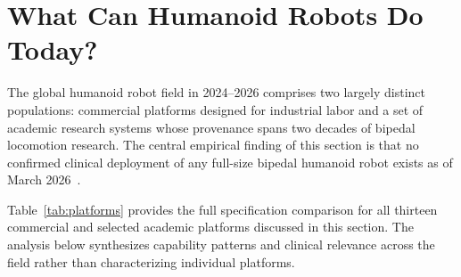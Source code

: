 ﻿%
\section{What Can Humanoid Robots Do Today?}
\label{sec:systems}

The global humanoid robot field in 2024--2026 comprises two largely distinct
populations: commercial platforms designed for industrial labor and a set of
academic research systems whose provenance spans two decades of bipedal
locomotion research. The central empirical finding of this section is that no
confirmed clinical deployment of any full-size bipedal humanoid robot exists as
of March 2026~\cite{atar2025humanoids,cho2026humanoid,cunha2025humanoid}.

Table~\ref{tab:platforms} provides the full specification comparison for all
thirteen commercial and selected academic platforms discussed in this section.
The analysis below synthesizes capability patterns and clinical relevance across
the field rather than characterizing individual platforms.

